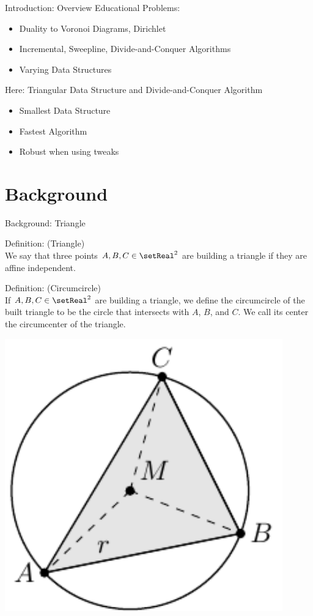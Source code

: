\documentclass[aspectratio=169]{beamer}
\begin{document}
\begin{frame}{Introduction: Overview}
  Educational Problems:
  \begin{itemize}
    \item Duality to Voronoi Diagrams, Dirichlet
    \item Incremental, Sweepline, Divide-and-Conquer Algorithms
    \item Varying Data Structures
  \end{itemize}
  \bigskip
  Here: Triangular Data Structure and Divide-and-Conquer Algorithm
  \begin{itemize}
    \item Smallest Data Structure
    \item Fastest Algorithm
    \item Robust when using tweaks
  \end{itemize}
\end{frame}

\section{Background}
\begin{frame}{Background: Triangle}
  \begin{minipage}[c]{0.45\textwidth}
    Definition: (Triangle)\\
    We say that three points $A, B, C \in \setReal^2$ are building a triangle if they are affine independent.
    \bigskip

    Definition: (Circumcircle)\\
    If $A, B, C \in \setReal^2$ are building a triangle, we define the circumcircle of the built triangle to be the circle that intersects with $A$, $B$, and $C$.
    We call its center the circumcenter of the triangle.
  \end{minipage}
  \hfill
  \begin{minipage}[c]{0.49\textwidth}
    \centering
    \includegraphics[width=0.9\textwidth]{figures/triangle-circumcirle.pdf}
  \end{minipage}
\end{frame}
\end{document}
